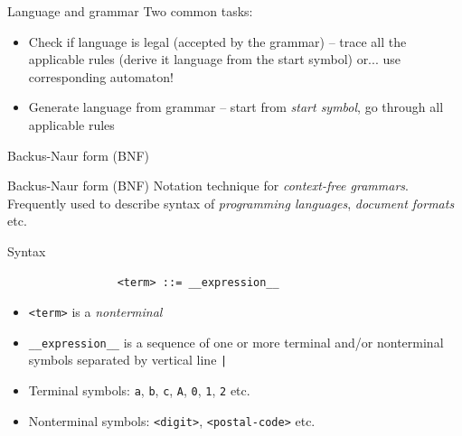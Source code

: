 \documentclass{beamer}
\begin{document}
\begin{frame}{Language and grammar}
Two common tasks:


\begin{itemize}
	\item Check if language is legal (accepted by the grammar) -- trace all the applicable rules (derive it language from the start symbol) or... use corresponding automaton!
	\item Generate language from grammar -- start from \textit{start symbol}, go through all applicable rules
\end{itemize}
\end{frame}

\begin{frame}[fragile]{Backus-Naur form (BNF)}

\begin{block}{Backus-Naur form (BNF)}
Notation technique for \textit{context-free grammars}. Frequently used to describe syntax of \textit{programming languages}, \textit{document formats} etc.
\end{block}


\begin{block}{Syntax}
\begin{verbatim}
                 <term> ::= __expression__
\end{verbatim}
\vskip -0.5cm
\begin{itemize}
\item \verb|<term>| is a \textit{nonterminal}
\item \verb|__expression__| is a sequence of one or more terminal and/or nonterminal symbols separated by vertical line \verb$|$
\item Terminal symbols: \verb|a|, \verb|b|, \verb|c|, \verb|A|, \verb|0|, \verb|1|, \verb|2| etc.
\item Nonterminal symbols: \verb|<digit>|, \verb|<postal-code>| etc.
\end{itemize}
\end{block}

\end{frame}
\end{document}
